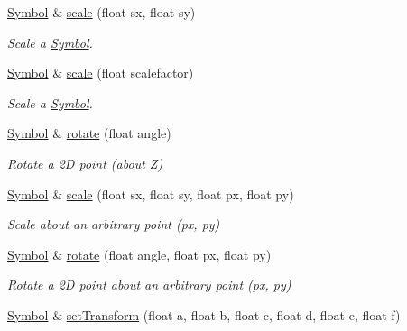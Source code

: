 \begin{DoxyCompactItemize}
\hyperlink{classbridges_1_1datastructure_1_1_symbol}{Symbol} \& \hyperlink{classbridges_1_1datastructure_1_1_symbol_a3801b726e1d6bacd4706fe8b5466b8e6}{scale} (float sx, float sy)
\begin{DoxyCompactList}\small\item\em Scale a \hyperlink{classbridges_1_1datastructure_1_1_symbol}{Symbol}. \end{DoxyCompactList}\item 
\hyperlink{classbridges_1_1datastructure_1_1_symbol}{Symbol} \& \hyperlink{classbridges_1_1datastructure_1_1_symbol_a444bdb4259285dc95e13d27303f94102}{scale} (float scalefactor)
\begin{DoxyCompactList}\small\item\em Scale a \hyperlink{classbridges_1_1datastructure_1_1_symbol}{Symbol}. \end{DoxyCompactList}\item 
\hyperlink{classbridges_1_1datastructure_1_1_symbol}{Symbol} \& \hyperlink{classbridges_1_1datastructure_1_1_symbol_a85f585750a1948576548349619233bb3}{rotate} (float angle)
\begin{DoxyCompactList}\small\item\em Rotate a 2D point (about Z) \end{DoxyCompactList}\item 
\hyperlink{classbridges_1_1datastructure_1_1_symbol}{Symbol} \& \hyperlink{classbridges_1_1datastructure_1_1_symbol_af19cf1d01da1070509bf7c8fce36b3ce}{scale} (float sx, float sy, float px, float py)
\begin{DoxyCompactList}\small\item\em Scale about an arbitrary point (px, py) \end{DoxyCompactList}\item 
\hyperlink{classbridges_1_1datastructure_1_1_symbol}{Symbol} \& \hyperlink{classbridges_1_1datastructure_1_1_symbol_a6464d5a9ce0405097871ef7e6e015e7b}{rotate} (float angle, float px, float py)
\begin{DoxyCompactList}\small\item\em Rotate a 2D point about an arbitrary point (px, py) \end{DoxyCompactList}\item 
\hyperlink{classbridges_1_1datastructure_1_1_symbol}{Symbol} \& \hyperlink{classbridges_1_1datastructure_1_1_symbol_a0afcc5b50d056e40900ef9bac6c2c3d0}{set\+Transform} (float a, float b, float c, float d, float e, float f)
\end{DoxyCompactItemize}
